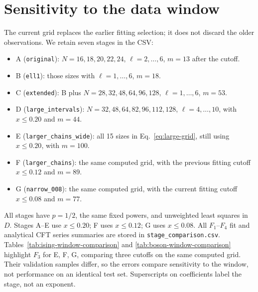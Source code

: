\section{Sensitivity to the data window}
\label{sec:window-comparison}
The current grid replaces the earlier fitting selection; it does not
discard the older observations. We retain seven stages in the CSV:
\begin{itemize}
\item A (\texttt{original}): $N=16,18,20,22,24$, $\ell=2,\ldots,6$,
$m=13$ after the cutoff.
\item B (\texttt{ell1}): those sizes with $\ell=1,\ldots,6$, $m=18$.
\item C (\texttt{extended}): B plus $N=28,32,48,64,96,128$,
$\ell=1,\ldots,6$, $m=53$.
\item D (\texttt{large\_intervals}): $N=32,48,64,82,96,112,128$,
$\ell=4,\ldots,10$, with $x\leq0.20$ and $m=44$.
\item E (\texttt{larger\_chains\_wide}): all 15 sizes in
Eq.~\eqref{eq:large-grid}, still using $x\leq0.20$, with $m=100$.
\item F (\texttt{larger\_chains}): the same computed grid, with the
previous fitting cutoff $x\leq0.12$ and $m=89$.
\item G (\texttt{narrow\_008}): the same computed grid, with the
current fitting cutoff $x\leq0.08$ and $m=77$.
\end{itemize}
All stages have $p=1/2$, the same fixed powers, and unweighted least
squares in $D$. Stages A--E use $x\leq0.20$; F uses $x\leq0.12$;
G uses $x\leq0.08$.
All $F_1$--$F_4$ fit and analytical CFT series
summaries are stored in \texttt{stage\_comparison.csv}.
Tables~\ref{tab:ising-window-comparison} and \ref{tab:boson-window-comparison}
highlight $F_3$ for E, F, G, comparing three cutoffs on the same
computed grid. Their validation samples differ, so the
errors compare sensitivity to the window, not performance on an identical
test set. Superscripts on coefficients label the stage, not an exponent.

\begin{table}[htbp]\centering\scriptsize

\caption{Ising $F_3$ fits for stages E, F, G, with three free coefficients
at powers $\alpha,\alpha+2,\alpha+4$ and fixed
$\alpha=4$ for $I\leftrightarrow\eps$, two otherwise. The geometries,
sample counts and stage-dependent cutoffs are defined in
Appendix~\ref{sec:window-comparison}. States use the
critical periodic Hamiltonian $H=-\sum XX-\sum Z$ and exact covariance
reductions. CV RMSE is the complete-size holdout error in
Eq.~\eqref{eq:cv}. Coefficients multiply powers of $\pi x$.}
\label{tab:ising-window-comparison}
\end{table}
\begin{table}[htbp]\centering\scriptsize

\caption{Boson $F_3$ fits for the same stages E, F, G and objective, with
fixed $\alpha=2$, three free coefficients, charge codes $(0,0),(1,1),(3,1)$,
$q=2$, $z_j=e^{2\pi i j/N}$, $w_1=0$, $W=10^8$, and normalized
vertex/Jastrow states. All stages use $p=1/2$ and natural logarithms;
CV RMSE has the definition in Eq.~\eqref{eq:cv}.}
\label{tab:boson-window-comparison}
\end{table}

